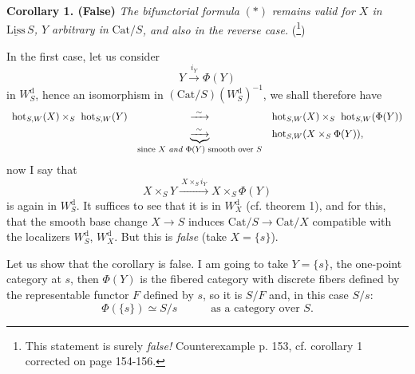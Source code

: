 \documentclass[11pt]{article}
\newcommand{\msp}[1]{\marginpar{\footnotesize [#1]}}
\newcommand{\Cat}{\mathrm{Cat}}
\newcommand{\hot}{\mathrm{hot}}
\newcommand{\Liss}{\underline{\mathrm{Liss}}\,}
\newcommand{\dd}{\mathrm{d}}
\begin{document}
\textbf{Corollary 1. (False)} \textit{The bifunctorial formula} $(*)$ \textit{remains valid for $X$ in} $\Liss S$\textit{, $Y$ arbitrary in} $\Cat/S$\textit{, and also in the reverse case.} (\footnote[73]{This statement is surely \textit{false!} Counterexample p. 153, cf. corollary 1 corrected on page 154-156.})

In the first case, let us consider
\[
Y \xrightarrow{i_Y} \Phi(Y)
\]
in $W^{\dd}_S$, hence an isomorphism in $(\Cat/S)(W^{\dd}_S)^{-1}$, we shall therefore have
\[
\begin{array}{lcl}
\hot_{S,W}(X) \times_S\ \hot_{S,W}(Y) & \xrightarrow{\ \sim\ } & \hot_{S,W}(X) \times_S\ \hot_{S,W}(\Phi(Y)) \\[1ex]
 & \underbrace{\xrightarrow{\ \sim\ }}_{\text{\footnotesize since $X$ \textit{and} $\Phi(Y)$ smooth over $S$}} & \hot_{S,W}(X \times_S \Phi(Y)),
\end{array}
\]
now I say that
\[
X \times_S Y \xrightarrow{\ X\times_S i_Y\ } X \times_S \Phi(Y)
\]
is again in $W^{\dd}_S$. It suffices to see that it is in $W^{\dd}_X$ (cf. theorem 1), and for this, that the smooth base change $X \longrightarrow S$ induces $\Cat/S \longrightarrow \Cat/X$ compatible with the localizers $W^{\dd}_S$, $W^{\dd}_X$. But this is \textit{false} (take $X = \{s\}$).

\msp{page 153}
Let us show that the corollary is false. I am going to take $Y = \{s\}$, the one-point category at $s$, then $\Phi(Y)$ is the fibered category with discrete fibers defined by the representable functor $F$ defined by $s$, so it is $S/F$ and, in this case $S/s$: %
\[
\Phi(\{s\}) \simeq S/s \qquad\quad \text{as a category over } S.
\]
\end{document}
